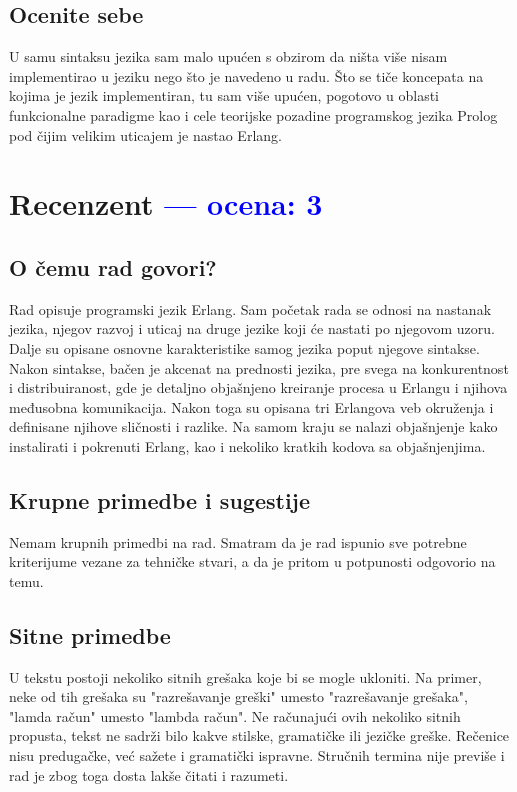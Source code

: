 \documentclass[a4paper]{report}
\newcommand{\odgovor}[1]{\textcolor{blue}{#1}}
\begin{document}
\section{Ocenite sebe}
U samu sintaksu jezika sam malo upućen s obzirom da ništa više nisam implementirao u jeziku nego što je navedeno u radu.
Što se tiče koncepata na kojima je jezik implementiran, tu sam više upućen, pogotovo u oblasti funkcionalne paradigme kao i cele teorijske pozadine programskog jezika Prolog pod čijim velikim  uticajem je nastao Erlang.

\chapter{Recenzent \odgovor{--- ocena: 3} }


\section{O čemu rad govori?}
Rad opisuje programski jezik Erlang. Sam početak rada se odnosi na nastanak jezika, njegov razvoj i uticaj na druge jezike koji će nastati po njegovom uzoru. Dalje su opisane osnovne karakteristike samog jezika poput njegove sintakse. Nakon sintakse, bačen je akcenat na prednosti jezika, pre svega na konkurentnost i distribuiranost, gde je detaljno objašnjeno kreiranje procesa u Erlangu i njihova međusobna komunikacija. Nakon toga su opisana tri Erlangova veb okruženja i definisane njihove sličnosti i razlike. Na samom kraju se nalazi objašnjenje kako instalirati i pokrenuti Erlang, kao i nekoliko kratkih kodova sa objašnjenjima.
    
    
\section{Krupne primedbe i sugestije}
Nemam krupnih primedbi na rad. Smatram da je rad ispunio sve potrebne kriterijume vezane za tehničke stvari, a da je pritom  u potpunosti odgovorio na temu.


\section{Sitne primedbe}
U tekstu postoji nekoliko sitnih grešaka koje bi se mogle ukloniti. Na primer, neke od tih grešaka su "razrešavanje greški"   umesto "razrešavanje grešaka", "lamda račun" umesto "lambda račun". Ne računajući ovih nekoliko sitnih propusta, tekst ne sadrži bilo kakve stilske, gramatičke ili jezičke greške. Rečenice nisu predugačke, već sažete i gramatički ispravne. Stručnih termina nije previše i rad je zbog toga dosta lakše čitati i razumeti.\\
\end{document}
